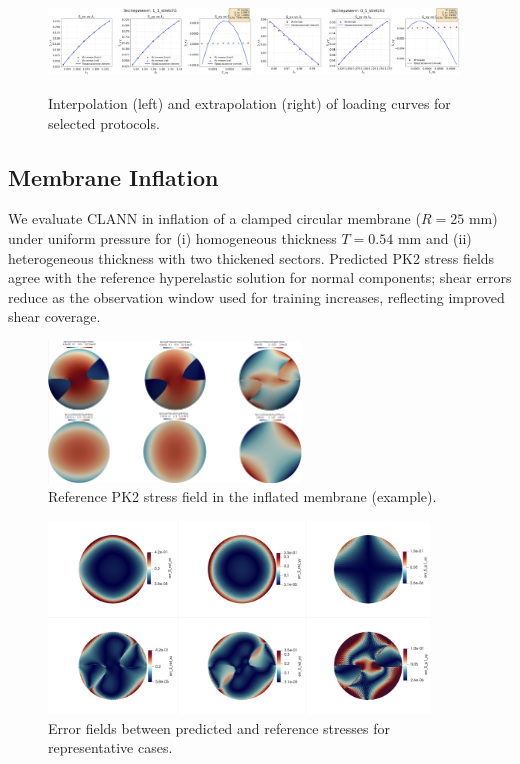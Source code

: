 \documentclass[journal,article,submit,pdftex,moreauthors]{Definitions/mdpi}
\begin{document}
\begin{figure}[H]
  \centering
  \includegraphics[width=0.48\textwidth]{../img/interpolation.png}\hfill
  \includegraphics[width=0.48\textwidth]{../img/extrapolation.png}
  \caption{Interpolation (left) and extrapolation (right) of loading curves for selected protocols.}
  \label{fig:interp_extrap}
\end{figure}

\subsection{Membrane Inflation}
We evaluate CLANN in inflation of a clamped circular membrane ($R=25$ mm) under uniform pressure for (i) homogeneous thickness $T=0.54$ mm and (ii) heterogeneous thickness with two thickened sectors. Predicted PK2 stress fields agree with the reference hyperelastic solution for normal components; shear errors reduce as the observation window used for training increases, reflecting improved shear coverage.

\begin{figure}[H]
  \centering
  \includegraphics[width=0.6\textwidth]{../img/Numerical/ref_stress.png}
  \caption{Reference PK2 stress field in the inflated membrane (example).}
  \label{fig:inflation_ref}
\end{figure}

\begin{figure}[H]
  \centering
  \includegraphics[width=0.9\textwidth]{../img/Numerical/errs.png}
  \caption{Error fields between predicted and reference stresses for representative cases.}
  \label{fig:inflation_errs}
\end{figure}
\end{document}
